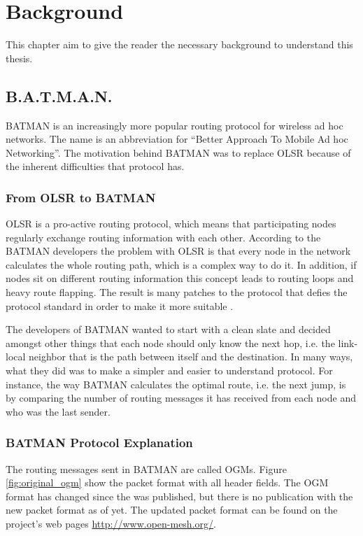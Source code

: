 \chapter{Background}
\acresetall

This chapter aim to give the reader the necessary background to understand this
thesis.

\section{B.A.T.M.A.N.}
BATMAN \cite{batman_rfc} is an increasingly more popular routing protocol for
wireless ad hoc networks. The name is an abbreviation for ``Better Approach To
Mobile Ad hoc Networking''. The motivation behind BATMAN was to replace OLSR
\cite{why-starting-batman} because of the inherent difficulties that protocol
has. 

\subsection{From OLSR to BATMAN}
OLSR is a pro-active routing protocol, which means that participating nodes
regularly exchange routing information with each other. According to the BATMAN
developers the problem with OLSR is that every node in the network calculates
the whole routing path, which is a complex way to do it. In addition, if nodes
sit on different routing information this concept leads to routing loops and
heavy route flapping. The result is many patches to the protocol that defies
the protocol standard in order to make it more suitable
\cite{why-starting-batman}.

The developers of BATMAN wanted to start with a clean slate and decided amongst
other things that each node should only know the next hop, i.e. the link-local
neighbor that is the path between itself and the destination. In many ways, what
they did was to make a simpler and easier to understand protocol. For instance,
the way BATMAN calculates the optimal route, i.e. the next jump, is by comparing
the number of routing messages it has received from each node and who was the
last sender.

\subsection{BATMAN Protocol Explanation}
The routing messages sent in BATMAN are called \acp{OGM}. Figure
\ref{fig:original_ogm} show the packet format with all header fields. The
\ac{OGM} format has changed since the \cite{batman_rfc} was published, but there
is no publication with the new packet format as of yet. The updated packet
format can be found on the project's web pages \url{http://www.open-mesh.org/}.

